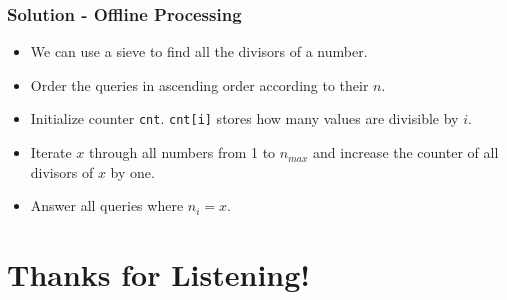 \documentclass{beamer}
\begin{document}
\begin{frame}
	\frametitle{Solution - Offline Processing}

	\begin{itemize}
		\item We can use a sieve to find all the divisors of a number.
		\item Order the queries in ascending order according to their $n$.
		\item Initialize counter \texttt{cnt}. \texttt{cnt[i]} stores how many values are divisible by $i$.
		\item Iterate $x$ through all numbers from 1 to $n_{max}$ and increase the counter of all divisors of $x$ by one.
		\item Answer all queries where $n_i = x$.
	\end{itemize}
\end{frame}

\section{Thanks for Listening!}
\end{document}
